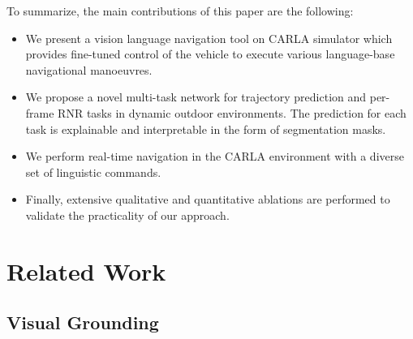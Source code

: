 \documentclass[11pt]{article}
\begin{document}
To summarize, the main contributions of this paper are the following:
\begin{itemize}
\item We present a vision language navigation tool on CARLA simulator which provides fine-tuned control of the vehicle to execute various language-base navigational manoeuvres.
\item We propose a novel multi-task network for trajectory prediction and per-frame RNR tasks in dynamic outdoor environments. The prediction for each task is explainable and interpretable in the form of segmentation masks.
\item We perform real-time navigation in the CARLA environment with a diverse set of linguistic commands.
\item Finally, extensive qualitative and quantitative ablations are performed to validate the practicality of our approach.  



\end{itemize}


\section{Related Work}

\subsection{Visual Grounding}
\end{document}
